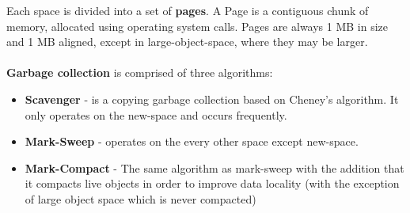 \documentclass{l4proj}
\begin{document}
Each space is divided into a set of \textbf{pages}. A Page is a contiguous chunk of memory, allocated using operating system calls. Pages are always 1 MB in size and 1 MB aligned, except in large-object-space, where they may be larger\cite{v8gctour}.
\\\\
\textbf{Garbage collection} is comprised of three algorithms:
\begin{itemize}
\item \textbf{Scavenger} - is a copying garbage collection based on Cheney's algorithm\cite{cheney}. It only operates on the new-space and occurs frequently.
\item \textbf{Mark-Sweep} - operates on the every other space except new-space.
\item \textbf{Mark-Compact} - The same algorithm as mark-sweep with the addition that it compacts live objects in order to improve data locality (with the exception of large object space which is never compacted)
\end{itemize}
\end{document}
